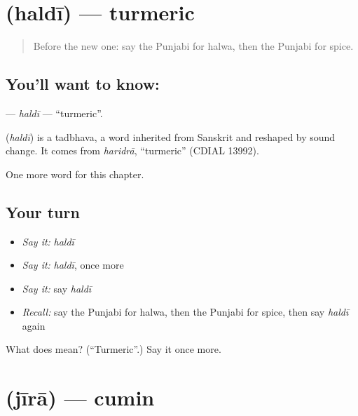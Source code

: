 \section[\texorpdfstring{\pa{ਹਲਦੀ} (haldī)}{ਹਲਦੀ (haldī)}]{ (haldī) — turmeric}

\label{lesson:PA-C125-haldi}



\begin{quote}
Before the new one: say the Punjabi for halwa, then the Punjabi for spice.
\end{quote}

\subsection*{You'll want to know: }
\textbf{} — \emph{haldī} — \textquotedblleft{}turmeric\textquotedblright{}.

\begin{cousinweb}
\textbf{} (\emph{haldī}) is a tadbhava, a word inherited from Sanskrit and reshaped by sound change. It comes from \emph{haridrā}, \textquotedblleft{}turmeric\textquotedblright{} (CDIAL 13992).
\end{cousinweb}

\begin{grammarlens}[title={What you've built}]
One more word for this chapter.
\end{grammarlens}

\subsection*{Your turn}
\begin{itemize}
\raggedright
  \item \emph{Say it:} \emph{haldī}
  \item \emph{Say it:} \emph{haldī}, once more
  \item \emph{Say it:} say \emph{haldī}
  \item \emph{Recall:} say the Punjabi for halwa, then the Punjabi for spice, then say \emph{haldī} again
\end{itemize}

\begin{tcolorbox}[breakable,colback=teal!4,colframe=teal!35!black,title={Before you move on}]
What does  mean? (\textquotedblleft{}Turmeric\textquotedblright{}.) Say it once more.
\end{tcolorbox}
\section[\texorpdfstring{\pa{ਜੀਰਾ} (jīrā)}{ਜੀਰਾ (jīrā)}]{ (jīrā) — cumin}

